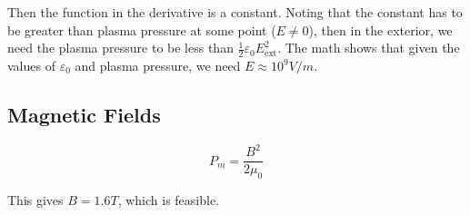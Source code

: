 \documentclass[12pt]{article}
\begin{document}
Then the function in the derivative is a constant. Noting that the constant has to be greater than plasma pressure at some point ($E\neq0$), then in the exterior, we need the plasma pressure to be less than $\frac{1}{2}\varepsilon_0E^2_{\text{ext}}$. The math shows that given the values of $\varepsilon_0$ and plasma pressure, we need $E \approx 10^9 \unit{V/m}$.

\subsection{Magnetic Fields}

$$P_m = \frac{B^2}{2\mu_0}$$

This gives $B = 1.6\unit{T}$, which is feasible.
\end{document}

